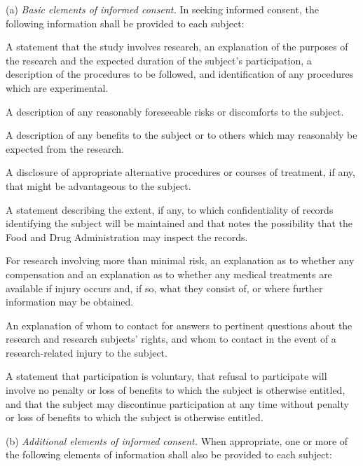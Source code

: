 \documentclass[11pt]{article}
\begin{document}
(a) \textit{Basic elements of informed consent.} In seeking informed consent, the following information shall be provided to each subject:

\begin{description}[leftmargin=1.0cm,style=sameline]
\item[(1)] A statement that the study involves research, an explanation of the purposes of the research and the expected duration of the subject's participation, a description of the procedures to be followed, and identification of any procedures which are experimental.
\item[(2)] A description of any reasonably foreseeable risks or discomforts to the subject.
\item[(3)] A description of any benefits to the subject or to others which may reasonably be expected from the research.
\item[(4)] A disclosure of appropriate alternative procedures or courses of treatment, if any, that might be advantageous to the subject.
\item[(5)] A statement describing the extent, if any, to which confidentiality of records identifying the subject will be maintained and that notes the possibility that the Food and Drug Administration may inspect the records.
\item[(6)] For research involving more than minimal risk, an explanation as to whether any compensation and an explanation as to whether any medical treatments are available if injury occurs and, if so, what they consist of, or where further information may be obtained.
\item[(7)] An explanation of whom to contact for answers to pertinent questions about the research and research subjects' rights, and whom to contact in the event of a research-related injury to the subject.
\item[(8)] A statement that participation is voluntary, that refusal to participate will involve no penalty or loss of benefits to which the subject is otherwise entitled, and that the subject may discontinue participation at any time without penalty or loss of benefits to which the subject is otherwise entitled.
\end{description}

(b) \textit{Additional elements of informed consent.} When appropriate, one or more of the following elements of information shall also be provided to each subject:
\end{document}
